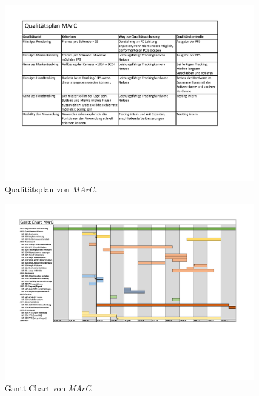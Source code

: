 \begin{figure}[htbp]
	\centering
	\includegraphics[angle=90,scale=.9, trim=1cm 1cm 3.5cm 1 cm]{kapitel/anhang/Qualitaetsplan.pdf}
	 \caption{Qualitätsplan von \textit{MArC}.}
	\label{fig:qualitaetsplan}
\end{figure}
\newpage

\begin{figure}[htbp]
	\centering
	\includegraphics[angle=90,scale=.8, trim=1cm 1cm 3.5cm 1 cm]{kapitel/anhang/GanttChart.pdf}
	 \caption{Gantt Chart von \textit{MArC}.}
	\label{fig:ganttchart}
\end{figure}
\newpage

